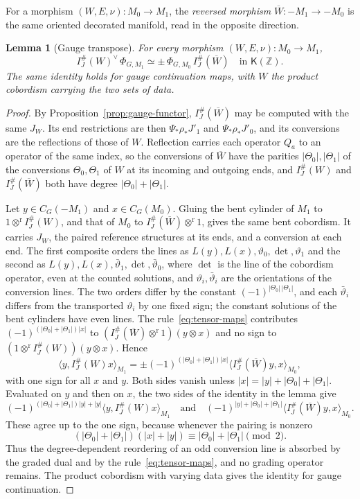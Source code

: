 \documentclass[11pt]{amsart}
\newtheorem{lemma}[theorem]{Lemma}
\theoremstyle{definition}
\theoremstyle{remark}
\theoremstyle{plain}
\numberwithin{equation}{section}
\newcommand{\ZZ}{\mathbb Z}
\newcommand{\cK}{\mathsf K}
\newcommand{\IG}{I^{\#}_{J}}
\begin{document}
For a morphism $(W,E,\nu):M_0\to M_1$, the \emph{reversed morphism}
$\overline W:-M_1\to-M_0$ is the same oriented decorated manifold, read
in the opposite direction.

\begin{lemma}[Gauge transpose]\label{lem:gauge-transpose}
For every morphism $(W,E,\nu):M_0\to M_1$,
\[
 \IG(W)^\vee\,\Phi_{G,M_1}\simeq\pm\,\Phi_{G,M_0}\,\IG(\overline W)
 \quad\text{in }\cK(\ZZ).
\]
The same identity holds for gauge continuation maps, with $W$ the
product cobordism carrying the two sets of data.
\end{lemma}

\begin{proof}
By Proposition~\ref{prop:gauge-functor}, $\IG(\overline W)$ may be
computed with the same $J_W$. Its end restrictions are then
$\Psi_*\rho_*J'_1$ and $\Psi_*\rho_*J'_0$, and its conversions are the
reflections of those of $W$. Reflection carries each operator $Q_a$ to
an operator of the same index, so the conversions of $\overline W$ have
the parities $|\Theta_0|,|\Theta_1|$ of the conversions $\Theta_0,\Theta_1$ of $W$ at its incoming and outgoing ends, and $\IG(W)$ and $\IG(\overline W)$ both
have degree $|\Theta_0|+|\Theta_1|$.

Let $y\in C_G(-M_1)$ and $x\in C_G(M_0)$. Gluing the bent
cylinder of $M_1$ to $1\otimes^{\mathrm r}\IG(W)$, and that of $M_0$ to
$\IG(\overline W)\otimes^{\mathrm r}1$, gives the same bent cobordism. It
carries $J_W$, the paired reference structures at its ends, and a
conversion at each end. The first composite orders the lines as
$L(y),L(x),\vartheta_0,\det,\vartheta_1$ and the second as
$L(y),L(x),\bar\vartheta_1,\det,\bar\vartheta_0$, where $\det$ is the
line of the cobordism operator, even at the counted solutions, and
$\vartheta_i,\bar\vartheta_i$ are the orientations of the conversion
lines. The two orders differ by the constant $(-1)^{|\Theta_0|\,|\Theta_1|}$, and each
$\bar\vartheta_i$ differs from the transported $\vartheta_i$ by one
fixed sign; the constant
solutions of the bent cylinders have even lines. The
rule~\eqref{eq:tensor-maps} contributes $(-1)^{(|\Theta_0|+|\Theta_1|)|x|}$ to
$(\IG(\overline W)\otimes^{\mathrm r}1)(y\otimes x)$ and no sign to
$(1\otimes^{\mathrm r}\IG(W))(y\otimes x)$. Hence
\[
 \langle y,\IG(W)x\rangle_{M_1}
  =\pm(-1)^{(|\Theta_0|+|\Theta_1|)|x|}\langle\IG(\overline W)y,x\rangle_{M_0},
\]
with one sign for all $x$ and $y$. Both sides vanish unless
$|x|=|y|+|\Theta_0|+|\Theta_1|$. Evaluated on $y$ and then on $x$, the two sides
of the identity in the lemma give
\[
 (-1)^{(|\Theta_0|+|\Theta_1|)|y|+|y|}\langle y,\IG(W)x\rangle_{M_1}
 \quad\text{and}\quad
 (-1)^{|y|+|\Theta_0|+|\Theta_1|}\langle\IG(\overline W)y,x\rangle_{M_0}.
\]
These agree up to the one sign, because whenever the pairing is nonzero
\[
 (|\Theta_0|+|\Theta_1|)(|x|+|y|)\equiv|\Theta_0|+|\Theta_1|\pmod2 .
\]
Thus the degree-dependent reordering of an odd
conversion line is absorbed by the graded dual and by the
rule~\eqref{eq:tensor-maps}, and no grading operator remains. The
product cobordism with varying data gives the identity for gauge
continuation.
\end{proof}
\end{document}
